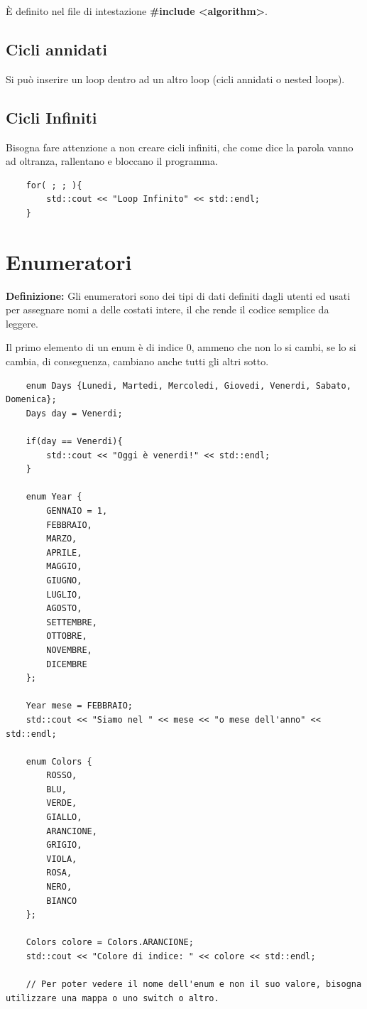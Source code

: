 \textsf{\small È definito nel file di intestazione \textbf{\#include <algorithm>}.} \\

\subsection{Cicli annidati}

\textsf{\small Si può inserire un loop dentro ad un altro loop (cicli annidati o nested loops).} \\

\subsection{Cicli Infiniti}

\textsf{\small Bisogna fare attenzione a non creare cicli infiniti, che come dice la parola vanno ad oltranza, rallentano e bloccano il programma.}\\

\begin{lstlisting}
	for( ; ; ){
		std::cout << "Loop Infinito" << std::endl;
	}
\end{lstlisting}


\section{Enumeratori}

\textsf{\small \textbf{Definizione: } Gli enumeratori sono dei tipi di dati definiti dagli utenti ed usati per assegnare nomi a delle costati intere, il che rende il codice semplice da leggere.}

\textsf{\small Il primo elemento di un enum è di indice 0, ammeno che non lo si cambi, se lo si cambia, di conseguenza, cambiano anche tutti gli altri sotto.} \\

\begin{lstlisting}
	enum Days {Lunedi, Martedi, Mercoledi, Giovedi, Venerdi, Sabato, Domenica};
	Days day = Venerdi;
	
	if(day == Venerdi){
		std::cout << "Oggi è venerdi!" << std::endl;
	}
	
	enum Year {
		GENNAIO = 1,
		FEBBRAIO,
		MARZO,
		APRILE,
		MAGGIO,
		GIUGNO,
		LUGLIO,
		AGOSTO,
		SETTEMBRE,
		OTTOBRE,
		NOVEMBRE,
		DICEMBRE
	};

	Year mese = FEBBRAIO;
	std::cout << "Siamo nel " << mese << "o mese dell'anno" << std::endl;

	enum Colors {
		ROSSO,
		BLU,
		VERDE,
		GIALLO,
		ARANCIONE,
		GRIGIO,
		VIOLA,
		ROSA,
		NERO,
		BIANCO
	};	

	Colors colore = Colors.ARANCIONE;
	std::cout << "Colore di indice: " << colore << std::endl;
	
	// Per poter vedere il nome dell'enum e non il suo valore, bisogna utilizzare una mappa o uno switch o altro.
\end{lstlisting}

